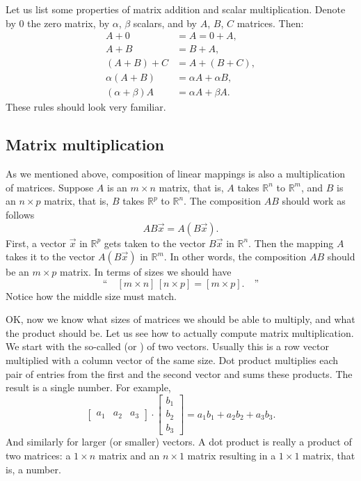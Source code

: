 \documentclass{ximera}
\begin{document}
Let us list some properties of matrix addition and scalar multiplication. Denote by $0$ the zero matrix, by $\alpha$, $\beta$ scalars, and by $A$, $B$, $C$ matrices.  Then:
\begin{align*}
    A + 0 & = A = 0 + A , \\
    A + B & = B + A , \\
    (A + B) + C & = A + (B + C) , \\
    \alpha(A+B) & = \alpha A+\alpha B, \\
    (\alpha+\beta)A & = \alpha A + \beta A.
\end{align*}
These rules should look very familiar.

\subsection{Matrix multiplication}

As we mentioned above, composition of linear mappings is also a multiplication of matrices.  Suppose $A$ is an $m \times n$ matrix, that is, $A$ takes ${\mathbb R}^n$ to ${\mathbb R}^m$, and $B$ is an $n \times p$ matrix, that is, $B$ takes ${\mathbb R}^p$ to ${\mathbb R}^n$.  The composition $AB$ should work as follows
\begin{equation*}
    AB\vec{x} = A(B\vec{x}) .
\end{equation*}
First, a vector $\vec{x}$ in ${\mathbb R}^p$ gets taken to the vector $B\vec{x}$ in ${\mathbb R}^n$.  Then the mapping $A$ takes it to the vector $A(B\vec{x})$ in ${\mathbb R}^m$.  In other words, the composition $AB$ should be an $m \times p$ matrix.  In terms of sizes we should have
\begin{equation*}
    \text{``}
    \quad [ m \times n ] \, [ n \times p ] = [ m \times p ] . \quad
    \text{''}
\end{equation*}
Notice how the middle size must match.

OK\@, now we know what sizes of matrices we should be able to multiply, and what the product should be. Let us see how to actually compute matrix multiplication. We start with the so-called \emph{} (or \emph{}) of two vectors. Usually this is a row vector multiplied with a column vector of the same size.  Dot product multiplies each pair of entries from the first and the second vector and sums these products.  The result is a single number. For example,
\begin{equation*}
    \begin{bmatrix}
        a_1 & a_2 & a_3
    \end{bmatrix}
    \cdot
    \begin{bmatrix}
        b_1 \\
        b_2 \\
        b_3
    \end{bmatrix}
    = a_1 b_1 + a_2 b_2 + a_3 b_3 .
\end{equation*}
And similarly for larger (or smaller) vectors. A dot product is really a product of two matrices: a $1 \times n$ matrix and an $n \times 1$ matrix resulting in a $1 \times 1$ matrix, that is, a number.
\end{document}
